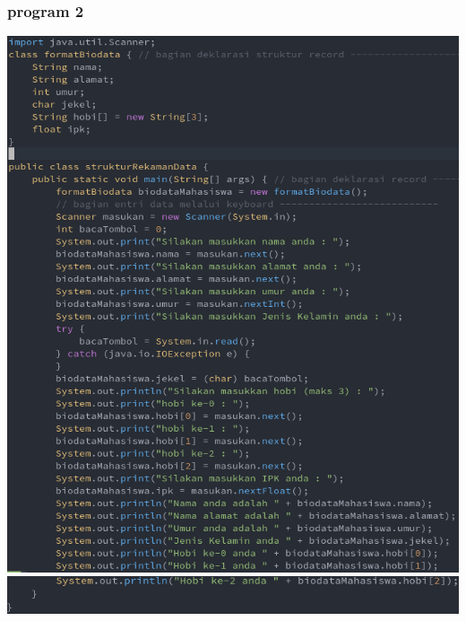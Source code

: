 \documentclass[a4paper,12pt]{article}
\begin{document}
\subsubsection{program 2}
\begin{center}
    \includegraphics[scale=.5]{code02.png} 
    \includegraphics[scale=.5]{code03.png} 
\end{center}
\end{document}
